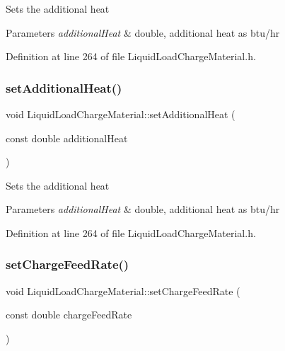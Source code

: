 Sets the additional heat 
\begin{DoxyParams}{Parameters}
{\em additional\+Heat} & double, additional heat as btu/hr \\
\hline
\end{DoxyParams}


Definition at line 264 of file Liquid\+Load\+Charge\+Material.\+h.

\mbox{\label{class_liquid_load_charge_material_a557c1f588cfb972ff0c7f748d6c2bd8f}} 
\subsubsection{\texorpdfstring{set\+Additional\+Heat()}{setAdditionalHeat()}\hspace{0.1cm}{\footnotesize\ttfamily [3/3]}}
{\footnotesize\ttfamily void Liquid\+Load\+Charge\+Material\+::set\+Additional\+Heat (\begin{DoxyParamCaption}\item[{const double}]{additional\+Heat }\end{DoxyParamCaption})\hspace{0.3cm}{\ttfamily [inline]}}

Sets the additional heat 
\begin{DoxyParams}{Parameters}
{\em additional\+Heat} & double, additional heat as btu/hr \\
\hline
\end{DoxyParams}


Definition at line 264 of file Liquid\+Load\+Charge\+Material.\+h.

\mbox{\label{class_liquid_load_charge_material_a23d6aa6f15a124ddb1504261347b0b82}} 
\subsubsection{\texorpdfstring{set\+Charge\+Feed\+Rate()}{setChargeFeedRate()}\hspace{0.1cm}{\footnotesize\ttfamily [1/3]}}
{\footnotesize\ttfamily void Liquid\+Load\+Charge\+Material\+::set\+Charge\+Feed\+Rate (\begin{DoxyParamCaption}\item[{const double}]{charge\+Feed\+Rate }\end{DoxyParamCaption})\hspace{0.3cm}{\ttfamily [inline]}}


